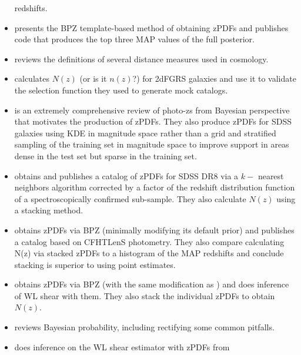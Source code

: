 \documentclass[preprint]{aastex}
\begin{document}
\begin{itemize}
redshifts.
\item \citet{ben98} presents the BPZ template-based method of obtaining zPDFs 
and publishes code that produces the top three MAP values of the full 
posterior.  
\item \citet{hog99} reviews the definitions of several distance measures used 
in cosmology.
\item \citet{nor01} calculates $N(z)$ (or is it $n(z)$?) for 2dFGRS galaxies 
and use it to validate the selection function they used to generate mock 
catalogs.
\item \citet{bud08} is an extremely comprehensive review of photo-zs from 
Bayesian perspective that motivates the production of zPDFs. They also produce 
zPDFs for SDSS galaxies using KDE in magnitude space rather than a grid and 
stratified sampling of the training set in magnitude space to improve support 
in areas dense in the test set but sparse in the training set.
\item \citet{she11} obtains and publishes a catalog of zPDFs for SDSS DR8 via a 
$k-$ nearest neighbors algorithm corrected by a factor of the redshift 
distribution function of a spectroscopically confirmed sub-sample.  They also 
calculate $N(z)$ using a stacking method.
\item \citet{hil11} obtains zPDFs via BPZ (minimally modifying its default 
prior) and publishes a catalog based on CFHTLenS photometry.  They also compare 
calculating N(z) via stacked zPDFs to a histogram of the MAP redshifts and 
conclude stacking is superior to using point estimates.
\item \citet{kel12} obtains zPDFs via BPZ (with the same modification as 
\citet{hil11}) and does inference of WL shear with them.  They also stack the 
individual zPDFs to obtain $N(z)$.
\item \citet{hog12} reviews Bayesian probability, including rectifying some 
common pitfalls.
\item \citet{app12} does inference on the WL shear estimator with zPDFs from 

\end{itemize}
\end{document}
